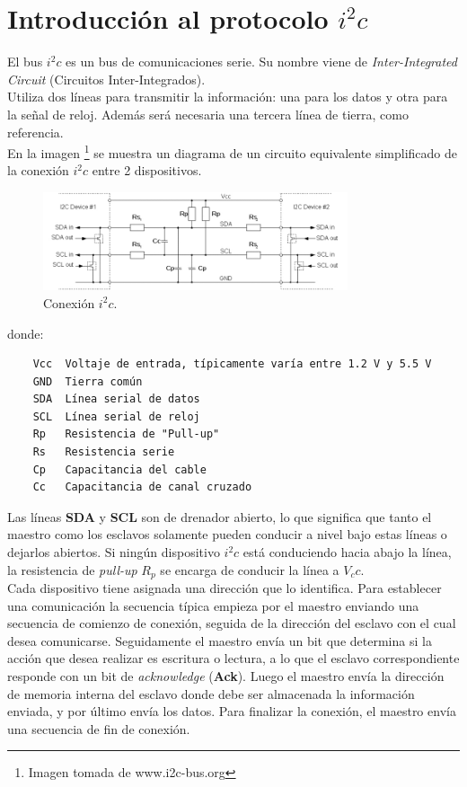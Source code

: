 \documentclass[spanish,12pt,a4paper,titlepage]{report}
\begin{document}
\newpage
\section{Introducción al protocolo $i^2c$}

El bus $i^2c$ es un bus de comunicaciones serie. Su nombre viene de \emph{Inter-Integrated Circuit} (Circuitos Inter-Integrados).\\
Utiliza dos líneas para transmitir la información: una para los datos y otra para la señal de reloj. Además será necesaria una tercera línea de tierra, como referencia.\\
En la imagen \label{fig:setup}\footnote{Imagen tomada de www.i2c-bus.org} se muestra un diagrama de un circuito equivalente simplificado de la conexión $i^2c$ entre 2 dispositivos.

\begin{figure}[h!]
	\centering
	\includegraphics[width=0.8\textwidth]{./pics/setup.jpg}
	\caption{Conexión $i^2c$.}
	\label{fig:setup}
\end{figure}
donde:
\begin{verbatim}
	Vcc	 Voltaje de entrada, típicamente varía entre 1.2 V y 5.5 V
	GND	 Tierra común
	SDA	 Línea serial de datos
	SCL	 Línea serial de reloj
	Rp 	 Resistencia de "Pull-up"
	Rs 	 Resistencia serie
	Cp 	 Capacitancia del cable
	Cc 	 Capacitancia de canal cruzado
\end{verbatim}

Las líneas \textbf{SDA} y \textbf{SCL} son de drenador abierto, lo que significa que tanto el maestro como los esclavos solamente pueden conducir a nivel bajo estas líneas o dejarlos abiertos. Si ningún dispositivo $i^2c$ está conduciendo hacia abajo la línea, la resistencia de \emph{pull-up} $R_p$ se encarga de conducir la línea a $V_cc$.\\

Cada dispositivo tiene asignada una dirección que lo identifica. Para establecer una comunicación la secuencia típica empieza por el maestro enviando una secuencia de comienzo de conexión, seguida de la dirección del esclavo con el cual desea comunicarse. Seguidamente el maestro envía un bit que determina si la acción que desea realizar es escritura o lectura, a lo que el esclavo correspondiente responde con un bit de \emph{acknowledge} (\textbf{Ack}). Luego el maestro envía la dirección de memoria interna del esclavo donde debe ser almacenada la información enviada, y por último envía los datos. Para finalizar la conexión, el maestro envía una secuencia de fin de conexión.
\end{document}
